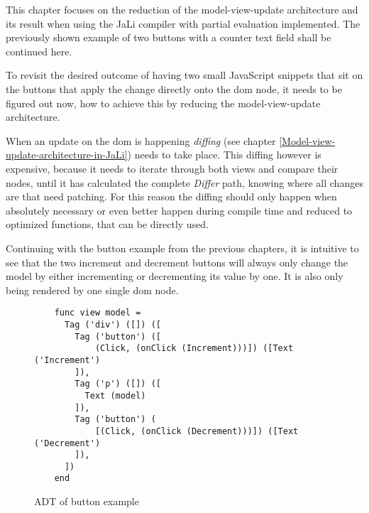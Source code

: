   
This chapter focuses on the reduction of the model-view-update architecture and its result when using the JaLi compiler with partial evaluation implemented.
The previously shown example of two buttons with a counter text field shall be continued here.

To revisit the desired outcome of having two small JavaScript snippets that sit on the buttons that apply the change directly onto the \gls{dom} node, it needs to be figured out now, how to achieve this by reducing the model-view-update architecture.

When an update on the \gls{dom} is happening \textit{diffing} (see chapter \ref{Model-view-update-architecture-in-JaLi}) needs to take place.
This diffing however is expensive, because it needs to iterate through both views and compare their nodes, until it has calculated the complete \textit{Differ} path, knowing where all changes are that need patching. For this reason the diffing should only happen when absolutely necessary or even better happen during compile time and reduced to optimized functions, that can be directly used.

Continuing with the button example from the previous chapters, it is intuitive to see that the two increment and decrement buttons will always only change the model by either incrementing or decrementing its value by one. It is also only being rendered by one single \gls{dom} node.

\begin{figure}[H]
    \centering
    \begin{verbatim}
    func view model =
      Tag ('div') ([]) ([
        Tag ('button') ([
            (Click, (onClick (Increment)))]) ([Text ('Increment')
        ]),
        Tag ('p') ([]) ([
          Text (model)
        ]),
        Tag ('button') (
            [(Click, (onClick (Decrement)))]) ([Text ('Decrement')
        ]),
      ])
    end
    \end{verbatim}
    \caption{ADT of button example}
    \label{fig:button-view-function}
\end{figure}

